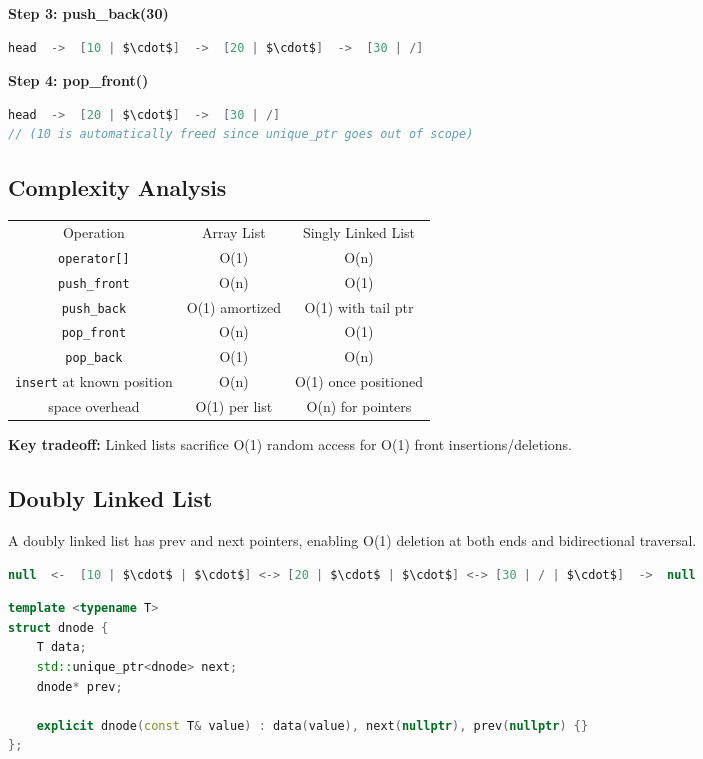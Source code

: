 \textbf{Step 3: push\_back(30)}
\begin{lstlisting}[language=Java]
head  ->  [10 | $\cdot$]  ->  [20 | $\cdot$]  ->  [30 | /]
\end{lstlisting}

\textbf{Step 4: pop\_front()}
\begin{lstlisting}[language=Java]
head  ->  [20 | $\cdot$]  ->  [30 | /]
// (10 is automatically freed since unique_ptr goes out of scope)
\end{lstlisting}

\subsection{Complexity Analysis}

\begin{center}
\begin{tabular}{ccc}
\toprule
Operation & Array List & Singly Linked List \\
\texttt{operator[]} & O(1) & O(n) \\
\texttt{push\_front} & O(n) & O(1) \\
\texttt{push\_back} & O(1) amortized & O(1) with tail ptr \\
\texttt{pop\_front} & O(n) & O(1) \\
\texttt{pop\_back} & O(1) & O(n) \\
\texttt{insert} at known position & O(n) & O(1) once positioned \\
space overhead & O(1) per list & O(n) for pointers \\

\bottomrule
\end{tabular}
\end{center}
\textbf{Key tradeoff:} Linked lists sacrifice O(1) random access for O(1) front insertions/deletions.

\subsection{Doubly Linked List}

A doubly linked list has prev and next pointers, enabling O(1) deletion at both ends and bidirectional traversal.

\begin{lstlisting}[language=Java]
null  <-  [10 | $\cdot$ | $\cdot$] <-> [20 | $\cdot$ | $\cdot$] <-> [30 | / | $\cdot$]  ->  null
\end{lstlisting}

\begin{lstlisting}[language=C++]
template <typename T>
struct dnode {
    T data;
    std::unique_ptr<dnode> next;
    dnode* prev;

    explicit dnode(const T& value) : data(value), next(nullptr), prev(nullptr) {}
};
\end{lstlisting}

